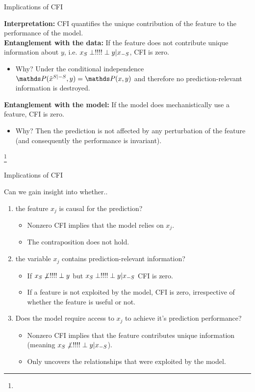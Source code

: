 \documentclass[11pt,compress,t,notes=noshow, aspectratio=169, xcolor=table]{beamer}
\begin{document}
\begin{vbframe}{Implications of CFI}

\textbf{Interpretation:} CFI quantifies the unique contribution of the feature to the performance of the model.\\
\lz
\textbf{Entanglement with the data:} If the feature does not contribute unique information about $y$, i.e. $x_S \indep y | x_{-S}$, CFI is zero.\\
\begin{itemize}
  \item Why? Under the conditional independence $\P(\pert{x}{S}{-S}, y) = \P(x,y)$ and therefore no prediction-relevant information is destroyed.
\end{itemize}
\lz
\textbf{Entanglement with the model:} If the model does mechanistically use a feature, CFI is zero.\\
\begin{itemize}
  \item Why? Then the prediction is not affected by any perturbation of the feature (and consequently the performance is invariant).
\end{itemize}

\footnote[frame]{}
\end{vbframe}


\begin{vbframe}{Implications of CFI}

Can we gain insight into whether..

\begin{enumerate}
    \item the feature $x_j$ is causal for the prediction?
    \begin{itemize}
      \item Nonzero CFI implies that the model relies on $x_j$.
      \item The contraposition does not hold.
    \end{itemize}
    \item the variable $x_j$ contains prediction-relevant information?
    \begin{itemize}
      \item If $x_S \not \indep y$ but $x_S \indep y | x_{-S}$ CFI is zero.
      \item If a feature is not exploited by the model, CFI is zero, irrespective of whether the feature is useful or not.
    \end{itemize}
    \item Does the model require access to $x_j$ to achieve it's prediction performance?
\begin{itemize}
      \item Nonzero CFI implies that the feature contributes unique information (meaning $x_S \not \indep y | x_{-S}$).
      \item Only uncovers the relationships that were exploited by the model.
    \end{itemize}
\end{enumerate}
\end{vbframe}
\end{document}
